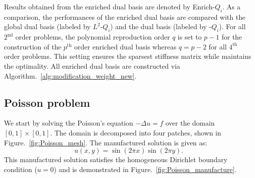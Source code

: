 Results obtained from the enriched dual basis are denoted by Enrich-$Q_i$. As a comparison, the performances of the enriched dual basis are compared with the global dual basis (labeled by $L^2$-$Q_i$) and the \Bezier dual basis (labeled by \Bezier-$Q_i$). For all $2^\text{nd}$ order problems, the polynomial reproduction order $q$ is set to $p-1$ for the construction of the $p^\text{th}$ order enriched dual basis whereas $q=p-2$ for all $4^\text{th}$ order problems. This setting ensures the sparsest stiffness matrix while maintains the optimality. All enriched dual basis are constructed via Algorithm.~\ref{alg:modification_weight_new}.

\subsection{Poisson problem}\label{sec:poisson_problem}

We start by solving the Poisson's equation $-\Delta u=f$ over the domain $\left[ 0, 1\right]\times \left[ 0, 1\right]$. The domain is decomposed into four patches, shown in Figure.~\ref{fig:Poisson_mesh}. The manufactured solution is given as:
\begin{equation}
	u(x,y) = \sin(2\pi x)\sin(2 \pi y).
\end{equation}
This manufactured solution satisfies the homogeneous Dirichlet boundary condition ($u=0$) and is demonstrated in Figure.~\ref{fig:Poisson_manufacture}.

